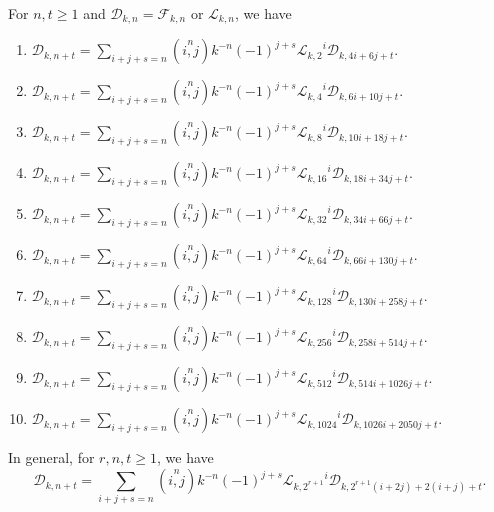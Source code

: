 \begin{theorem} For $n, t\geq 1$ and $\mathcal{D}_{k,n}=\mathcal{F}_{k,n}$ or $\mathcal{L}_{k,n}$, we have\label{3.6}
\begin{enumerate}
\item $\mathcal{D}_{k,n+t}=\sum\limits_{i+j+s=n}^{}\left( \stackrel{n}{i,j}\right) k^{-n}(-1)^{j+s}{\mathcal{L}_{k,2}}^i\mathcal{D}_{k,4i+6j+t} $.
\item $\mathcal{D}_{k,n+t}=\sum\limits_{i+j+s=n}\left( \stackrel{n}{i,j}\right) k^{-n}(-1)^{j+s}{\mathcal{L}_{k,4}}^i\mathcal{D}_{k,6i+10j+t} $.
\item $\mathcal{D}_{k,n+t}=\sum\limits_{i+j+s=n}\left( \stackrel{n}{i,j}\right) k^{-n}(-1)^{j+s}{\mathcal{L}_{k,8}}^i\mathcal{D}_{k,10i+18j+t} $.
\item $\mathcal{D}_{k,n+t}=\sum\limits_{i+j+s=n}\left( \stackrel{n}{i,j}\right) k^{-n}(-1)^{j+s}{\mathcal{L}_{k,16}}^i\mathcal{D}_{k,18i+34j+t} $.
\item $\mathcal{D}_{k,n+t}=\sum\limits_{i+j+s=n}\left( \stackrel{n}{i,j}\right) k^{-n}(-1)^{j+s}{\mathcal{L}_{k,32}}^i\mathcal{D}_{k,34i+66j+t} $.
\item $\mathcal{D}_{k,n+t}=\sum\limits_{i+j+s=n}\left( \stackrel{n}{i,j}\right) k^{-n}(-1)^{j+s}{\mathcal{L}_{k,64}}^i\mathcal{D}_{k,66i+130j+t} $.
\item $\mathcal{D}_{k,n+t}=\sum\limits_{i+j+s=n}\left( \stackrel{n}{i,j}\right) k^{-n}(-1)^{j+s}{\mathcal{L}_{k,128}}^i\mathcal{D}_{k,130i+258j+t} $.
\item $\mathcal{D}_{k,n+t}=\sum\limits_{i+j+s=n}\left( \stackrel{n}{i,j}\right) k^{-n}(-1)^{j+s}{\mathcal{L}_{k,256}}^i\mathcal{D}_{k,258i+514j+t} $.
\item $\mathcal{D}_{k,n+t}=\sum\limits_{i+j+s=n}\left( \stackrel{n}{i,j}\right) k^{-n}(-1)^{j+s}{\mathcal{L}_{k,512}}^i\mathcal{D}_{k,514i+1026j+t} $.
\item $\mathcal{D}_{k,n+t}=\sum\limits_{i+j+s=n}\left( \stackrel{n}{i,j}\right) k^{-n}(-1)^{j+s}{\mathcal{L}_{k,1024}}^i\mathcal{D}_{k,1026i+2050j+t} $.
\end{enumerate}
In general, for $r, n, t\geq 1$, we have
$$\mathcal{D}_{k,n+t}=\sum\limits_{i+j+s=n}\left( \stackrel{n}{i,j}\right) k^{-n}(-1)^{j+s}{\mathcal{L}_{k,2^{r+1}}}^i\mathcal{D}_{k,2^{r+1}(i+2j)+2(i+j)+t}. $$
\end{theorem}
